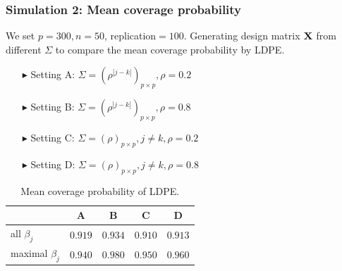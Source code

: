 \begin{frame}
\frametitle{Simulation 2: Mean coverage probability}
We set $p=300, n=50$, replication$=100$. Generating design matrix $\mbox{\bf X}$ from different $\Sigma$ to compare the mean coverage probability by LDPE.
\begin{itemize}
\item[$\blacktriangleright$] Setting A: $\Sigma=(\rho^{|j-k|})_{p\times p}, \rho = 0.2$
\item[$\blacktriangleright$] Setting B: $\Sigma=(\rho^{|j-k|})_{p\times p}, \rho = 0.8$
\item[$\blacktriangleright$] Setting C: $\Sigma=(\rho)_{p\times p}, j\neq k, \rho = 0.2$
\item[$\blacktriangleright$] Setting D: $\Sigma=(\rho)_{p\times p}, j\neq k, \rho = 0.8$
\end{itemize}

\begin{table}[h]
\caption{Mean coverage probability of LDPE.}
\begin{tabular}{lcccc}
\toprule
&A&B&C&D\\
\midrule
all $\beta_j$& $0.919$ & $0.934$ & $0.910$ & $0.913$ \\
maximal $\beta_j$& $0.940$ & $0.980$ & $0.950$ & $0.960$ \\
\bottomrule
\end{tabular}

\label{liu2}
\end{table}
\end{frame}


